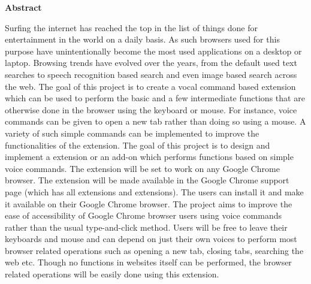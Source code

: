 \documentclass[11pt]{report} %
\begin{document}
	
	
	
	\thispagestyle{empty}
	\begin{center}
		\begin{minipage}{\linewidth}
			\vspace{3cm}
			{\centering \bf{Abstract}\par}
			\vspace{0.5cm}
			Surfing the internet has reached the top in the list of things done for entertainment in the world on a daily basis. As such browsers used for this purpose have unintentionally become the most used applications on a desktop or laptop. 
			Browsing trends have evolved over the years, from the default used text searches to speech recognition based search and even image based search across the web. 
			The goal of this project is to create a vocal command based extension which can be used to perform the basic and a few intermediate functions that are otherwise done in the browser using the keyboard or mouse. 
			For instance, voice commands can be given to open a new tab rather than doing so using a mouse. A variety of such simple commands can be implemented to improve the functionalities of the extension.
			The goal of this project is to design and implement a extension or an add-on which performs functions based on simple voice commands. The extension will be set to work on any Google Chrome browser. The extension will be made available in the Google Chrome support page (which has all extensions and extensions). 
			The users can install it and make it available on their Google Chrome browser.  
			The project aims to improve the ease of accessibility of Google Chrome browser users using voice commands rather than the usual type-and-click method. 
			Users will be free to leave their keyboards and mouse and can depend on just their own voices to perform most browser related operations such as opening a new tab, closing tabs, searching the web etc. Though no functions in websites itself can be performed, the browser related operations will be easily done using this extension. 
		\end{minipage}
	\end{center}
	\clearpage
	
\end{document}
